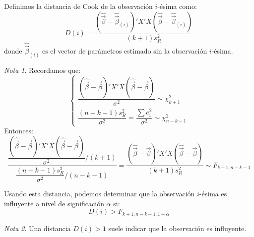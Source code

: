 \documentclass{report}
\theoremstyle{remark}
\theoremstyle{remark}
\newtheorem*{note}{Nota}
\theoremstyle{remark}
\theoremstyle{definition}
\theoremstyle{definition}
\theoremstyle{definition}
\begin{document}
Definimos la distancia de Cook de la observación $i$-ésima como:
$$D(i) = \frac{(\hat{\vec{\beta}}-\hat{\vec{\beta}}_{(i)})'X'X(\hat{\vec{\beta}}-\hat{\vec{\beta}}_{(i)})}{(k+1)s_R^2}$$
donde $\hat{\vec{\beta}}_{(i)}$ es el vector de parámetros estimado sin la observación $i$-ésima.

\begin{note}
    Recordamos que:
    $$\begin{cases}
            \dfrac{(\hat{\vec{\beta}}-\vec{\beta})'X'X(\hat{\vec{\beta}}-\vec{\beta})}{\sigma^2} \sim \chi^2_{k+1} \\
            \dfrac{(n-k-1)s_R^2}{\sigma^2} = \dfrac{\sum e_i^2}{\sigma^2} \sim \chi^2_{n-k-1}
        \end{cases}$$
    Entonces:
    $$\frac{\dfrac{(\hat{\vec{\beta}}-\vec{\beta})'X'X(\hat{\vec{\beta}}-\vec{\beta})}{\sigma^2} / (k+1)}{\dfrac{(n-k-1)s_R^2}{\sigma^2} / (n-k-1)} = \frac{(\hat{\vec{\beta}}-\vec{\beta})'X'X(\hat{\vec{\beta}}-\vec{\beta})}{(k+1)s_R^2} \sim F_{k+1, n-k-1}$$
\end{note}

Usando esta distancia, podemos determinar que la observación $i$-ésima es influyente a nivel de significación $\alpha$ si:
$$D(i) > F_{k+1, n-k-1, 1-\alpha}$$

\begin{note}
    Una distancia $D(i) > 1$ suele indicar que la observación es influyente.
\end{note}
\end{document}
